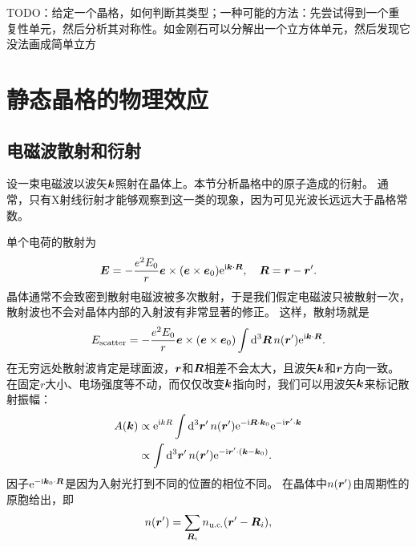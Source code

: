 TODO：给定一个晶格，如何判断其类型；一种可能的方法：先尝试得到一个重复性单元，然后分析其对称性。如金刚石可以分解出一个立方体单元，然后发现它没法画成简单立方


\section{静态晶格的物理效应}

\subsection{电磁波散射和衍射}

设一束电磁波以波矢$\vb*{k}$照射在晶体上。本节分析晶格中的原子造成的衍射。
通常，只有X射线衍射才能够观察到这一类的现象，因为可见光波长远远大于晶格常数。

单个电荷的散射为
\begin{equation}
    \vb*{E} = - \frac{e^2 E_0}{r} \vb*{e} \times (\vb*{e} \times \vb*{e}_0) \mathrm{e}^{\mathrm{i} \vb*{k} \cdot \vb*{R}}, \quad \vb*{R} = \vb*{r} - \vb*{r}'.
\end{equation}
晶体通常不会致密到散射电磁波被多次散射，于是我们假定电磁波只被散射一次，散射波也不会对晶体内部的入射波有非常显著的修正。
这样，散射场就是
\begin{equation}
    E_\text{scatter} = -\frac{e^2 E_0}{r} \vb*{e} \times (\vb*{e} \times \vb*{e}_0) \int \dd[3]{\vb*{R}} n(\vb*{r}') \mathrm{e}^{\mathrm{i} \vb*{k} \cdot \vb*{R}}.
\end{equation}
在无穷远处散射波肯定是球面波，$\vb*{r}$和$\vb*{R}$相差不会太大，且波矢$\vb*{k}$和$\vb*{r}$方向一致。
在固定$r$大小、电场强度等不动，而仅仅改变$\vb*{k}$指向时，我们可以用波矢$\vb*{k}$来标记散射振幅：
\begin{equation}
    \begin{aligned}
        A(\vb*{k}) &\propto \mathrm{e}^{\mathrm{i} k R} \int \dd[3]{\vb*{r}'} n(\vb*{r}') \mathrm{e}^{- \mathrm{i} \vb*{R} \cdot \vb*{k}_0} \mathrm{e}^{- \mathrm{i} \vb*{r}' \cdot \vb*{k}} \\
        &\propto \int \dd[3]{\vb*{r}'} n(\vb*{r}') \mathrm{e}^{- \mathrm{i} \vb*{r}' \cdot (\vb*{k} - \vb*{k}_0)}.
    \end{aligned}
    \label{eq:scatter-amplitude-x-ray-original}
\end{equation}
因子$\mathrm{e}^{- \mathrm{i} \vb*{k}_0 \cdot \vb*{R}}$是因为入射光打到不同的位置的相位不同。
在晶体中$n(\vb*{r}')$由周期性的原胞给出，即
\begin{equation}
    n(\vb*{r}') = \sum_{\vb*{R}_i} n_\text{u.c.}(\vb*{r}' - \vb*{R}_i),
\end{equation}
